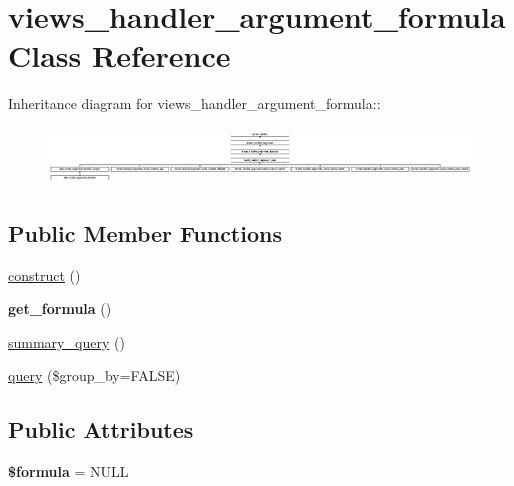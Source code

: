 \hypertarget{classviews__handler__argument__formula}{
\section{views\_\-handler\_\-argument\_\-formula Class Reference}
\label{classviews__handler__argument__formula}
}
Inheritance diagram for views\_\-handler\_\-argument\_\-formula::\begin{figure}[H]
\begin{center}
\leavevmode
\includegraphics[height=1.5047cm]{classviews__handler__argument__formula}
\end{center}
\end{figure}
\subsection*{Public Member Functions}
\begin{DoxyCompactItemize}
\item 
\hyperlink{classviews__handler__argument__formula_a01284402427de2bcfa1b1da5792a2332}{construct} ()
\item 
\hypertarget{classviews__handler__argument__formula_ae1020f5dfbc10c763872797d6fdc2248}{
{\bfseries get\_\-formula} ()}
\label{classviews__handler__argument__formula_ae1020f5dfbc10c763872797d6fdc2248}

\item 
\hyperlink{classviews__handler__argument__formula_a377fd11d178f88a0bd68c2ec9d6f9e00}{summary\_\-query} ()
\item 
\hyperlink{classviews__handler__argument__formula_aa8108173e62c8c7dfb17e734dce537b5}{query} (\$group\_\-by=FALSE)
\end{DoxyCompactItemize}
\subsection*{Public Attributes}
\begin{DoxyCompactItemize}
\item 
\hypertarget{classviews__handler__argument__formula_a536a444a8d134684f446a14895b46730}{
{\bfseries \$formula} = NULL}
\label{classviews__handler__argument__formula_a536a444a8d134684f446a14895b46730}

\end{DoxyCompactItemize}


